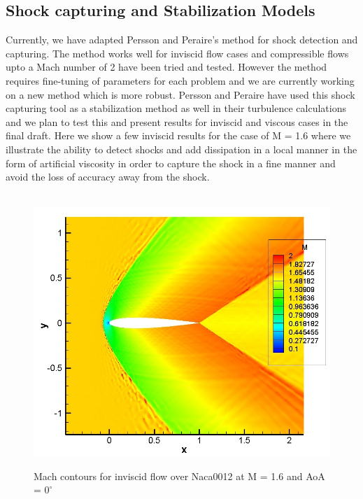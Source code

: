 \subsection{Shock capturing and Stabilization Models}


Currently, we have adapted Persson and Peraire's method \cite{Persson06} for shock detection and capturing. The method works well for inviscid flow cases and compressible flows upto a Mach number of 2 have been tried and tested. However the method requires fine-tuning of parameters for each problem and we are currently working on a new method which is more robust. Persson and Peraire have used this shock capturing tool as a stabilization method as well in their turbulence calculations and we plan to test this and present results for inviscid and viscous cases in the final draft. Here we show a few inviscid results for the case of M = 1.6 where we illustrate the ability to detect shocks and add dissipation in a local manner in the form of artificial viscosity in order to capture the shock in a fine manner and avoid the loss of accuracy away from the shock.    

\begin{figure}[h] \tt
\centering
\includegraphics[angle=0, scale = 0.55]{./figures/M1pt6order3-inv-720ktime-mach.jpg} \\
\caption{Mach contours for inviscid flow over Naca0012 at M = 1.6 and AoA = $0^{\circ} $}
\label{fig:inv_mach}
\end{figure}

